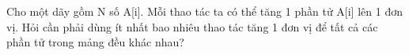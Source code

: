 Cho một dãy gồm N số A[i]. Mỗi thao tác ta có thể tăng 1 phần tử A[i] lên 1 đơn vị. Hỏi cần phải dùng ít nhất bao nhiêu thao tác tăng 1 đơn vị để tất cả các phần tử trong mảng đều khác nhau?